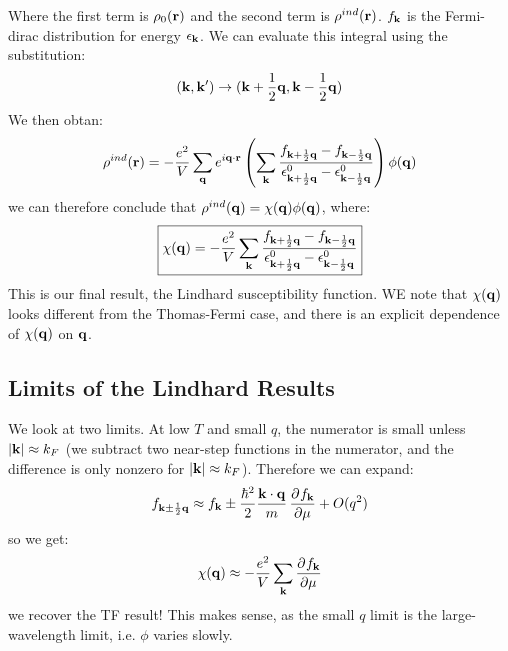 Where the first term is $\rho_0(\mathbf{r})$ and the second term is $\rho^{ind}(\mathbf{r})$. $f_{\mathbf{k}}$ is the Fermi-dirac distribution for energy $\epsilon_{\mathbf{k}}$. We can evaluate this integral using the substitution:
\begin{align*}
    (\mathbf{k}, \mathbf{k}') \to (\mathbf{k} + \frac{1}{2}\mathbf{q}, \mathbf{k} - \frac{1}{2}\mathbf{q})
\end{align*}
We then obtan:
\begin{equation}
    \rho^{ind}(\mathbf{r}) = -\frac{e^2}{V}\sum_{\mathbf{q}}e^{i\mathbf{q} \cdot \mathbf{r}}\left(\sum_{\mathbf{k}} \frac{f_{\mathbf{k} + \frac{1}{2}\mathbf{q}} - f_{\mathbf{k} - \frac{1}{2}\mathbf{q}}}{\epsilon^0_{\mathbf{k} + \frac{1}{2}\mathbf{q}} - \epsilon^0_{\mathbf{k} - \frac{1}{2}\mathbf{q}}}\right) \phi(\mathbf{q})
\end{equation}
we can therefore conclude that $\rho^{ind}(\mathbf{q}) = \chi(\mathbf{q})\phi(\mathbf{q})$, where:
\begin{equation}
    \boxed{\chi(\mathbf{q}) = -\frac{e^2}{V}\sum_{\mathbf{k}} \frac{f_{\mathbf{k} + \frac{1}{2}\mathbf{q}} - f_{\mathbf{k} - \frac{1}{2}\mathbf{q}}}{\epsilon^0_{\mathbf{k} + \frac{1}{2}\mathbf{q}} - \epsilon^0_{\mathbf{k} - \frac{1}{2}\mathbf{q}}}}
\end{equation}
This is our final result, the Lindhard susceptibility function. WE note that $\chi(\mathbf{q})$ looks different from the Thomas-Fermi case, and there is an explicit dependence of $\chi(\mathbf{q})$ on $\mathbf{q}$. 

\subsection{Limits of the Lindhard Results}
We look at two limits. At low $T$ and small $q$, the numerator is small unless $\lvert \mathbf{k} \rvert \approx k_F$ (we subtract two near-step functions in the numerator, and the difference is only nonzero for $\lvert \mathbf{k} \rvert \approx k_F$). Therefore we can expand:
\begin{equation}
    f_{\v{k} \pm \frac{1}{2}\v{q}} \approx f_\v{k} \pm \frac{\hbar^2}{2}\frac{\v{k} \cdot \v{q}}{m}\dpd{f_\v{k}}{\mu} + O(q^2)
\end{equation}
so we get:
\begin{equation}
    \chi(\v{q}) \approx -\frac{e^2}{V}\sum_{\v{k}}\dpd{f_\v{k}}{\mu}
\end{equation}
we recover the TF result! This makes sense, as the small $q$ limit is the large-wavelength limit, i.e. $\phi$ varies slowly.

